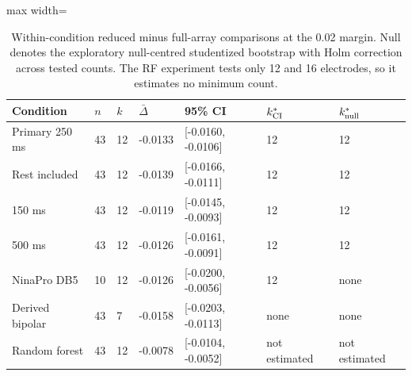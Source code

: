 \begin{table}[htbp]
\centering\small
\caption{Within-condition reduced minus full-array comparisons at the 0.02 margin. Null denotes the exploratory null-centred studentized bootstrap with Holm correction across tested counts. The RF experiment tests only 12 and 16 electrodes, so it estimates no minimum count.}\label{tab:sensitivity}
\begin{adjustbox}{max width=\textwidth}
\begin{tabular}{lllllll}\toprule
Condition & $n$ & $k$ & $\bar\Delta$ & 95\% CI & $k^*_{\rm CI}$ & $k^*_{\rm null}$\\\midrule
Primary 250 ms & 43 & 12 & -0.0133 & [-0.0160, -0.0106] & 12 & 12\\
Rest included & 43 & 12 & -0.0139 & [-0.0166, -0.0111] & 12 & 12\\
150 ms & 43 & 12 & -0.0119 & [-0.0145, -0.0093] & 12 & 12\\
500 ms & 43 & 12 & -0.0126 & [-0.0161, -0.0091] & 12 & 12\\
NinaPro DB5 & 10 & 12 & -0.0126 & [-0.0200, -0.0056] & 12 & none\\
Derived bipolar & 43 & 7 & -0.0158 & [-0.0203, -0.0113] & none & none\\
Random forest & 43 & 12 & -0.0078 & [-0.0104, -0.0052] & not estimated & not estimated\\
\bottomrule\end{tabular}
\end{adjustbox}
\end{table}
